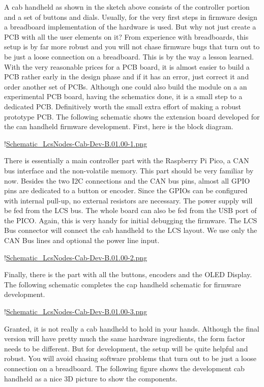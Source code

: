 
A cab handheld as shown in the sketch above consists of the controller portion and a set of buttons and dials. Usually, for the very first steps in firmware design a breadboard implementation of the hardware is used. But why not just create a PCB with all the user elements on it? From experience with breadboards, this setup is by far more robust and you will not chase firmware bugs that turn out to be just a loose connection on a breadboard. This is by the way a lesson learned. With the very reasonable prices for a PCB board, it is almost easier to build a PCB rather early in the design phase and if it has an error, just correct it and order another set of PCBs. Although one could also build the module on a an experimental PCB board, having the schematics done, it is a small step to a dedicated PCB. Definitively worth the small extra effort of making a robust prototype PCB. The following schematic shows the extension board developed for the can handheld firmware development. First, here is the block diagram.

!\href{./Schematics/Schematic_LcsNodes-Cab-Dev-B.01.00-1.png }{Schematic_LcsNodes-Cab-Dev-B.01.00-1.png}

There is essentially a main controller part with the Raspberry Pi Pico, a CAN bus interface and the non-volatile memory. This part should be very familiar by now. Besides the two I2C connections and the CAN bus pins, almost all GPIO pins are dedicated to a button or encoder. Since the GPIOs can be configured with internal pull-up, no external resistors are necessary. The power supply will be fed from the LCS bus. The whole board can also be fed from the USB port of the PICO. Again, this is very handy for initial debugging the firmware. The LCS Bus connector will connect the cab handheld to the LCS layout. We use only the CAN Bus lines and optional the power line input.

!\href{./Schematics/Schematic_LcsNodes-Cab-Dev-B.01.00-2.png }{Schematic_LcsNodes-Cab-Dev-B.01.00-2.png}

Finally, there is the part with all the buttons, encoders and the OLED Display. The following schematic completes the cap handheld schematic for firmware development.

!\href{./Schematics/Schematic_LcsNodes-Cab-Dev-B.01.00-3.png }{Schematic_LcsNodes-Cab-Dev-B.01.00-3.png}

Granted, it is not really a cab handheld to hold in your hands. Although the final version will have pretty much the same hardware ingredients, the form factor needs to be different. But for development, the setup will be quite helpful and robust. You will avoid chasing software problems that turn out to be just a loose connection on a breadboard. The following figure shows the development cab handheld as a nice 3D picture to show the components.

